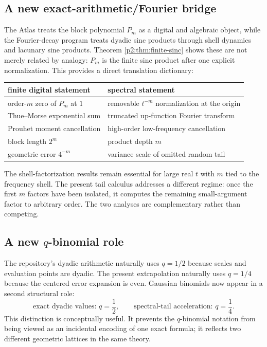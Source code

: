 \documentclass[11pt,oneside]{article}
\numberwithin{equation}{section}
\theoremstyle{definition}
\theoremstyle{remark}
\begin{document}
\subsection{A new exact-arithmetic/Fourier bridge}

The Atlas treats the block polynomial $P_m$ as a digital and algebraic object, while the
Fourier-decay program treats dyadic sinc products through shell dynamics and lacunary sine
products.  Theorem \ref{p2:thm:finite-sinc} shows these are not merely related by analogy:
$P_m$ is the finite sinc product after one explicit normalization.  This provides a direct
translation dictionary:
\begin{center}
\small
\begin{tabular}{@{}ll@{}}
\toprule
finite digital statement & spectral statement \\
\midrule
order-$m$ zero of $P_m$ at $1$ & removable $t^{-m}$ normalization at the origin\\
Thue--Morse exponential sum & truncated up-function Fourier transform\\
Prouhet moment cancellation & high-order low-frequency cancellation\\
block length $2^m$ & product depth $m$\\
geometric error $4^{-m}$ & variance scale of omitted random tail\\
\bottomrule
\end{tabular}
\end{center}

The shell-factorization results remain essential for large real $t$ with $m$ tied to the
frequency shell.  The present tail calculus addresses a different regime: once the first
$m$ factors have been isolated, it computes the remaining small-argument factor to arbitrary
order.  The two analyses are complementary rather than competing.

\subsection{A new $q$-binomial role}

The repository's dyadic arithmetic naturally uses $q=1/2$ because scales and evaluation
points are dyadic.  The present extrapolation naturally uses $q=1/4$ because the centered
error expansion is even.  Gaussian binomials now appear in a second structural role:
\begin{equation}
 \text{exact dyadic values: }q=\frac12,
 \qquad
 \text{spectral-tail acceleration: }q=\frac14.
 \label{p2:eq:two-q}
\end{equation}
This distinction is conceptually useful.  It prevents the $q$-binomial notation from being
viewed as an incidental encoding of one exact formula; it reflects two different geometric
lattices in the same theory.
\end{document}
